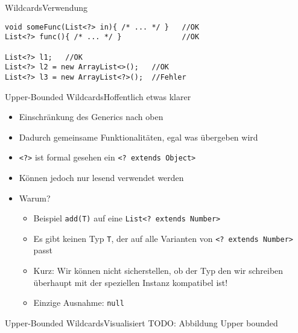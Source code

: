 \begin{frame}[fragile]{Wildcards}{Verwendung}
\lstset{style=java}
\begin{lstlisting}
void someFunc(List<?> in){ /* ... */ }   //OK
List<?> func(){ /* ... */ }              //OK

List<?> l1;   //OK
List<?> l2 = new ArrayList<>();   //OK
List<?> l3 = new ArrayList<?>();  //Fehler
\end{lstlisting}
\end{frame}

\begin{frame}{Upper-Bounded Wildcards}{Hoffentlich etwas klarer}
    \begin{itemize}[<+->]
        \item Einschränkung des Generics nach oben
        \item Dadurch gemeinsame Funktionalitäten, egal was übergeben wird
        \item \texttt{<?>} ist formal gesehen ein \texttt{<? extends Object>}
        \item Können jedoch nur lesend verwendet werden
        \item Warum?
        \begin{itemize}[<handout:0>]
            \item Beispiel \texttt{add(T)} auf eine \texttt{List<? extends Number>}
            \item Es gibt keinen Typ \texttt{T}, der auf alle Varianten von \texttt{<? extends Number>} passt
            \item Kurz: Wir können nicht sicherstellen, ob der Typ den wir schreiben überhaupt mit der speziellen Instanz kompatibel ist!
            \item Einzige Ausnahme: \texttt{null}
        \end{itemize}
    \end{itemize}
\end{frame}

\begin{frame}{Upper-Bounded Wildcards}{Visualisiert}
TODO: Abbildung Upper bounded
\end{frame}

